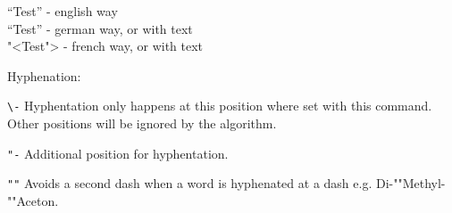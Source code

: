 \documentclass[10pt, a4paper]{article}
\begin{document}
``Test''  - english way\\
"`Test"'  - german way, or with \glqq text \grqq \\ 
"<Test"> - french way, or with \flqq text \frqq %

\vspace{1cm}
Hyphenation:

\verb+\-+ \quad Hyphentation only happens at this position where set with this command. Other positions will be ignored by the algorithm.

\verb+"-+ \quad Additional position for hyphentation.

\verb+""+ \quad Avoids a second dash when a word is hyphenated at a dash e.g. Di-""Methyl-""Aceton.
\end{document}
